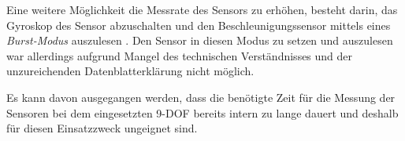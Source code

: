Eine weitere Möglichkeit die Messrate des Sensors zu erhöhen, besteht darin, das Gyroskop des Sensor abzuschalten und den Beschleunigungssensor mittels eines \emph{Burst-Modus} auszulesen \cite{lsm9ds1_manual}.
Den Sensor in diesen Modus zu setzen und auszulesen war allerdings aufgrund Mangel des technischen Verständnisses und der unzureichenden Datenblatterklärung nicht möglich.

Es kann davon ausgegangen werden, dass die benötigte Zeit für die Messung der Sensoren bei dem eingesetzten \ac{9-DOF} bereits intern zu lange dauert und deshalb für diesen Einsatzzweck ungeignet sind.
